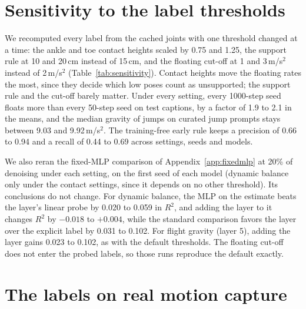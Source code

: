 \section{Sensitivity to the label thresholds}
\label{app:sensitivity}

\begin{table}[h]
\centering
\caption{Label thresholds changed one at a time (range over the three seeds of each model; the early rule ``abort if the decoded estimate shows floating'' is scored over the seeds of both MDM checkpoints).}
\label{tab:sensitivity}
\resizebox{\linewidth}{!}{}
\end{table}

We recomputed every label from the cached joints with one threshold changed at a time: the ankle and toe contact heights scaled by 0.75 and 1.25, the support rule at 10 and 20\,cm instead of 15\,cm, and the floating cut-off at 1 and 3\,m/s$^2$ instead of 2\,m/s$^2$ (Table~\ref{tab:sensitivity}). Contact heights move the floating rates the most, since they decide which low poses count as unsupported; the support rule and the cut-off barely matter. Under every setting, every 1000-step seed floats more than every 50-step seed on test captions, by a factor of 1.9 to 2.1 in the means, and the median gravity of jumps on curated jump prompts stays between 9.03 and 9.92\,m/s$^2$. The training-free early rule keeps a precision of 0.66 to 0.94 and a recall of 0.44 to 0.69 across settings, seeds and models.

We also reran the fixed-MLP comparison of Appendix~\ref{app:fixedmlp} at 20\% of denoising under each setting, on the first seed of each model (dynamic balance only under the contact settings, since it depends on no other threshold). Its conclusions do not change. For dynamic balance, the MLP on the estimate beats the layer's linear probe by 0.020 to 0.059 in $R^2$, and adding the layer to it changes $R^2$ by $-0.018$ to $+0.004$, while the standard comparison favors the layer over the explicit label by 0.031 to 0.102. For flight gravity (layer 5), adding the layer gains 0.023 to 0.102, as with the default thresholds. The floating cut-off does not enter the probed labels, so those runs reproduce the default exactly.

\section{The labels on real motion capture}
\label{app:realmotion}

